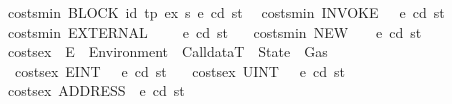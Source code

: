 \begin{isabellebody}
{\isacharbar}{\kern0pt}\ {\isachardoublequoteopen}costs{\isacharunderscore}{\kern0pt}min\ {\isacharparenleft}{\kern0pt}BLOCK\ {\isacharparenleft}{\kern0pt}{\isacharparenleft}{\kern0pt}id{}{\isacharcomma}{\kern0pt}\ tp{\isacharparenright}{\kern0pt}{\isacharcomma}{\kern0pt}\ ex{\isacharparenright}{\kern0pt}\ s{\isacharparenright}{\kern0pt}\ e\ cd\ st\ {\isacharequal}{\kern0pt}{}{\isachardoublequoteclose}\isanewline
{\isacharbar}{\kern0pt}\ {\isachardoublequoteopen}costs{\isacharunderscore}{\kern0pt}min\ {\isacharparenleft}{\kern0pt}INVOKE\ {\isacharunderscore}{\kern0pt}\ {\isacharunderscore}{\kern0pt}{\isacharparenright}{\kern0pt}\ e\ cd\ st\ {\isacharequal}{\kern0pt}\ {}{\isachardoublequoteclose}\isanewline
{\isacharbar}{\kern0pt}\ {\isachardoublequoteopen}costs{\isacharunderscore}{\kern0pt}min\ {\isacharparenleft}{\kern0pt}EXTERNAL\ {\isacharunderscore}{\kern0pt}\ {\isacharunderscore}{\kern0pt}\ {\isacharunderscore}{\kern0pt}\ {\isacharunderscore}{\kern0pt}{\isacharparenright}{\kern0pt}\ e\ cd\ st\ {\isacharequal}{\kern0pt}\ {}{\isachardoublequoteclose}\isanewline
{\isacharbar}{\kern0pt}\ {\isachardoublequoteopen}costs{\isacharunderscore}{\kern0pt}min\ {\isacharparenleft}{\kern0pt}NEW\ {\isacharunderscore}{\kern0pt}\ {\isacharunderscore}{\kern0pt}\ {\isacharunderscore}{\kern0pt}{\isacharparenright}{\kern0pt}\ e\ cd\ st\ {\isacharequal}{\kern0pt}\ {}{\isachardoublequoteclose}\isanewline
\isanewline
{}\isamarkupfalse%
\ costs{\isacharunderscore}{\kern0pt}ex\ {\isacharcolon}{\kern0pt}{\isacharcolon}{\kern0pt}\ {\isachardoublequoteopen}E\ {\isasymRightarrow}\ Environment\ {\isasymRightarrow}\ CalldataT\ {\isasymRightarrow}\ State\ {\isasymRightarrow}\ Gas{\isachardoublequoteclose}\isanewline
\ \ \isanewline
\ \ {\isachardoublequoteopen}costs{\isacharunderscore}{\kern0pt}ex\ {\isacharparenleft}{\kern0pt}E{\isachardot}{\kern0pt}INT\ {\isacharunderscore}{\kern0pt}\ {\isacharunderscore}{\kern0pt}{\isacharparenright}{\kern0pt}\ e\ cd\ st\ {\isacharequal}{\kern0pt}\ {}{\isachardoublequoteclose}\isanewline
{\isacharbar}{\kern0pt}\ {\isachardoublequoteopen}costs{\isacharunderscore}{\kern0pt}ex\ {\isacharparenleft}{\kern0pt}UINT\ {\isacharunderscore}{\kern0pt}\ {\isacharunderscore}{\kern0pt}{\isacharparenright}{\kern0pt}\ e\ cd\ st\ {\isacharequal}{\kern0pt}\ {}{\isachardoublequoteclose}\isanewline
{\isacharbar}{\kern0pt}\ {\isachardoublequoteopen}costs{\isacharunderscore}{\kern0pt}ex\ {\isacharparenleft}{\kern0pt}ADDRESS\ {\isacharunderscore}{\kern0pt}{\isacharparenright}{\kern0pt}\ e\ cd\ st\ {\isacharequal}{\kern0pt}\ {}{\isachardoublequoteclose}\isanewline

\end{isabellebody}
